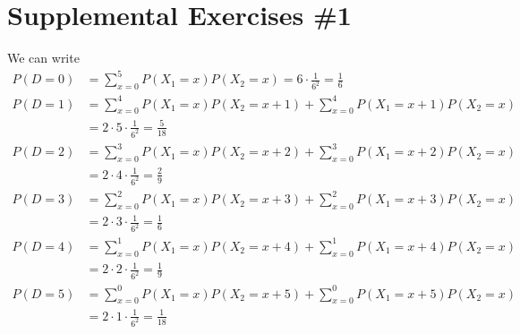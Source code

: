 \documentclass{scrartcl}
\begin{document}
\section{Supplemental Exercises \#1}
We can write
\begin{align*}
  P(D = 0)
  &= \sum^5_{x = 0} P(X_1 = x) P(X_2 = x)
  = 6 \cdot \frac{1}{6^2}
  = \frac{1}{6} \\
  P(D = 1)
  &= \sum^4_{x = 0} P(X_1 = x) P(X_2 = x + 1)
    + \sum^4_{x = 0} P(X_1 = x + 1) P(X_2 = x) \\
  &= 2 \cdot 5 \cdot \frac{1}{6^2}
  = \frac{5}{18} \\
  P(D = 2)
  &= \sum^3_{x = 0} P(X_1 = x) P(X_2 = x + 2)
    + \sum^3_{x = 0} P(X_1 = x + 2) P(X_2 = x) \\
  &= 2 \cdot 4 \cdot \frac{1}{6^2}
  = \frac{2}{9} \\
  P(D = 3)
  &= \sum^2_{x = 0} P(X_1 = x) P(X_2 = x + 3)
    + \sum^2_{x = 0} P(X_1 = x + 3) P(X_2 = x) \\
  &= 2 \cdot 3 \cdot \frac{1}{6^2}
  = \frac{1}{6} \\
  P(D = 4)
  &= \sum^1_{x = 0} P(X_1 = x) P(X_2 = x + 4)
    + \sum^1_{x = 0} P(X_1 = x + 4) P(X_2 = x) \\
  &= 2 \cdot 2 \cdot \frac{1}{6^2}
  = \frac{1}{9} \\
  P(D = 5)
  &= \sum^0_{x = 0} P(X_1 = x) P(X_2 = x + 5)
    + \sum^0_{x = 0} P(X_1 = x + 5) P(X_2 = x) \\
  &= 2 \cdot 1 \cdot \frac{1}{6^2}
  = \frac{1}{18}
\end{align*}
\end{document}
